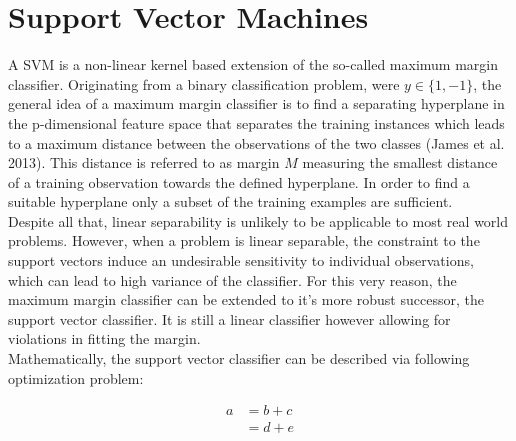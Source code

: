 \section{Support Vector Machines}

A SVM is a non-linear kernel based extension of the so-called maximum margin classifier. Originating from a binary classification problem, were $y \in \{1, -1\}$, the general idea of a maximum margin classifier is to find a separating hyperplane in the p-dimensional feature space that separates the training instances which leads to a maximum distance between the observations of the two classes (James et al. 2013). This distance is referred to as margin $M$ measuring the smallest distance of a training observation towards the defined hyperplane. In order to find a suitable hyperplane only a subset of the training examples are sufficient. \\

Despite all that, linear separability is unlikely to be applicable to most real world problems. However, when a problem is linear separable, the constraint to the support vectors induce an undesirable sensitivity to individual observations, which can lead to high variance of the classifier. For this very reason, the maximum margin classifier can be extended to it's more robust successor, the support vector classifier. It is still a linear classifier however allowing for violations in fitting the margin. \\

Mathematically, the support vector classifier can be described via following optimization problem:

\begin{align}
  a & = b + c \\
  & = d + e
\end{align}